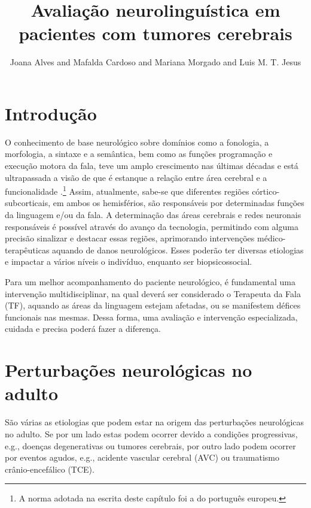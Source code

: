 \documentclass[output=paper,colorlinks,citecolor=brown,booklanguage=portuguese]{langscibook}
\title{Avaliação neurolinguística em pacientes com tumores cerebrais}
\author{Joana Alves \affiliation{Hospital das Forças Armadas – Pólo Porto, Porto, Portugal} and Mafalda Cardoso\affiliation{Unidade de Cuidados Continuados Solar Billadonnes, Penacova, Portugal} and  Mariana Morgado\affiliation{Campus Neurológico Sénior, Torres Vedras, Portugal} and  Luis M. T. Jesus\affiliation{Universidade de Aveiro, Aveiro, Portugal}}
\begin{document}
\maketitle

\section{Introdução}

O conhecimento de base neurológico sobre domínios como a fonologia, a morfologia, a sintaxe e a semântica, bem como as funções programação e execução motora da fala, teve um amplo crescimento nas últimas décadas e está ultrapassada a visão de que é estanque a relação entre área cerebral e a funcionalidade \citep{Friederici2011}.\footnote{A norma adotada na escrita deste capítulo foi a do português europeu.}
Assim, atualmente, sabe-se que diferentes regiões córtico-subcorticais, em ambos os hemisférios, são responsáveis por determinadas funções da linguagem e/ou da fala. A determinação das áreas cerebrais e redes neuronais responsáveis é possível através do avanço da tecnologia, permitindo com alguma precisão sinalizar e destacar essas regiões, aprimorando intervenções médico-terapêuticas aquando de danos neurológicos. Esses poderão ter diversas etiologias e impactar a vários níveis o indivíduo, enquanto ser biopsicossocial.

Para um melhor acompanhamento do paciente neurológico, é fundamental uma intervenção multidisciplinar, na qual deverá ser considerado o Terapeuta da Fala (TF), aquando as áreas da linguagem estejam afetadas, ou se manifestem défices funcionais nas mesmas. Dessa forma, uma avaliação e intervenção especializada, cuidada e precisa poderá fazer a diferença. 

\section{Perturbações neurológicas no adulto}

São várias as etiologias que podem estar na origem das perturbações neurológicas no adulto. Se por um lado estas podem ocorrer devido a condições progressivas, e.g., doenças degenerativas ou tumores cerebrais, por outro lado podem ocorrer por eventos agudos, e.g., acidente vascular cerebral (AVC) ou traumatismo crânio-encefálico (TCE).
\end{document}
